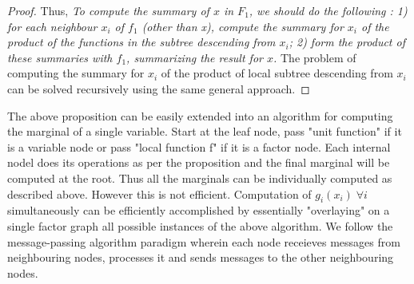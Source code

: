 \documentclass[letterpaper,english,10pt]{article}
\begin{document}
\begin{proof}
Thus, \textit{To compute the summary of $x$ in $F_1$, we should do the following : 1) for each neighbour $x_i$ of $f_1$ (other than x), compute
the summary for $x_i$ of the product of the functions in the subtree descending from $x_i$; 2) form the product of these summaries with $f_1$,
summarizing the result for $x$.}
\newline
The problem of computing the summary for $x_i$ of the product of local subtree descending from $x_i$ can be solved recursively using the same general approach.
\end{proof}

The above proposition can be easily extended into an algorithm for computing the marginal of a single variable. Start at the leaf node,
pass "unit function" if it is a variable node or pass "local function f" if it is a factor node. Each internal nodel does its operations as per
the proposition and the final marginal will be computed at the root.
Thus all the marginals can be individually computed as described above. However this is not efficient. Computation of $g_i(x_i)\; \forall i$ 
simultaneously can be efficiently accomplished by essentially "overlaying" on a single factor graph all possible instances of the above 
algorithm.
\newline
We follow the message-passing algorithm paradigm wherein each node receieves messages from neighbouring nodes, processes it and sends messages
to the other neighbouring nodes.
\end{document}
